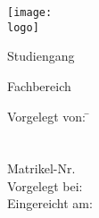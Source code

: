 \begin{titlepage}

\begin{minipage}{\textwidth}
		\noindent \hfill \texttt{[image: \\logo]}
\end{minipage}
\vspace{6em}

\begin{center}
    {\huge \art}
    
    {\Large Studiengang \studiengang}
    
    \vspace{3em}
    
    \textbf{{\Large \titel}}
    
    \vspace{3em}
    
    \hochschule
    
    \hochschulezusatz

    Fachbereich \fachbereich
    
    \vspace{4em}

	\begin{minipage}{\textwidth}
		\begin{tabbing}
		
		Vorgelegt von:  \hspace*{2em}\= \autor \\
		\> \strasseAutor \\
        \> \stadtAutor \\
        \> Matrikel-Nr. \matrikelnr \\
        Vorgelegt bei: \> \betreuer \\
        Eingereicht am: \> \datumAbgabe
		\end{tabbing}

	\end{minipage}
\end{center}
\end{titlepage}